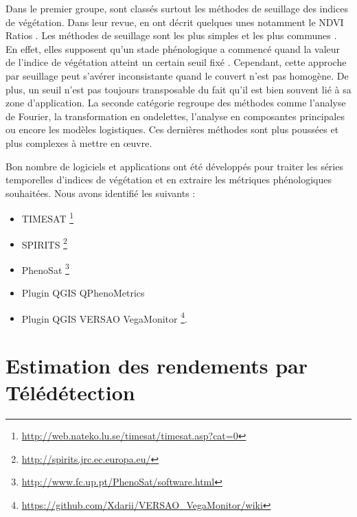 Dans le premier groupe, sont classés surtout les méthodes de seuillage des indices de végétation. Dans leur revue, \citep{deBeurs2010} en ont décrit quelques unes notamment le NDVI 
Ratios \citep{White1997}. Les méthodes de seuillage sont les plus simples et les plus communes \citep{Pan2015}. En effet, elles supposent qu’un stade phénologique a commencé quand 
la valeur de l'indice de végétation atteint un certain seuil fixé \citep{Jonsson2002}. Cependant, cette approche par seuillage peut s'avérer inconsistante quand le couvert n'est 
pas homogène. De plus, un seuil n'est pas toujours transposable du fait qu'il est bien souvent lié à sa zone d'application. La seconde catégorie regroupe  des méthodes comme
l'analyse de Fourier, la transformation en ondelettes, l'analyse en composantes principales ou encore les modèles logistiques. Ces dernières méthodes sont plus poussées et plus 
complexes à mettre en \oe uvre. 

\vspace{5mm}

Bon nombre de logiciels et applications ont été développés pour traiter les séries temporelles d'indices de végétation et en extraire les métriques phénologiques souhaitées. 
Nous avons identifié les suivants :
\begin{itemize}
 \item TIMESAT \footnote{\url{http://web.nateko.lu.se/timesat/timesat.asp?cat=0}} \citep{Eklundh2017} 
 \item SPIRITS \footnote{\url{http://spirits.jrc.ec.europa.eu/}}
 \item PhenoSat \footnote{\url{http://www.fc.up.pt/PhenoSat/software.html}} \citep{Rodrigues2013}
 \item Plugin QGIS QPhenoMetrics \citep{Duarte2018}
 \item Plugin QGIS VERSAO VegaMonitor \footnote{\url{https://github.com/Xdarii/VERSAO_VegaMonitor/wiki}}.
\end{itemize}

\section{Estimation des rendements par Télédétection}